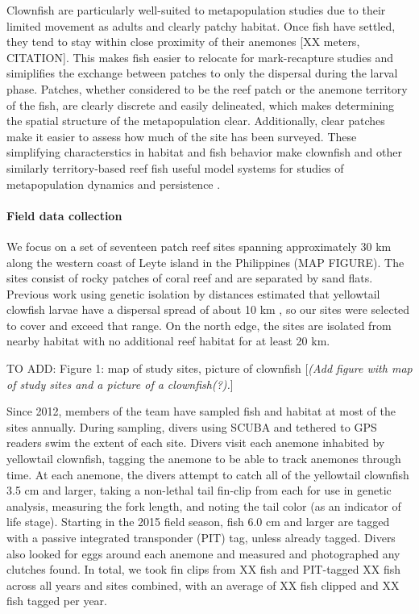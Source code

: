 \documentclass[12pt, oneside]{article}   	%
\begin{document}
Clownfish are particularly well-suited to metapopulation studies due to their limited movement as adults and clearly patchy habitat. Once fish have settled, they tend to stay within close proximity of their anemones [XX meters, CITATION]. This makes fish easier to relocate for mark-recapture studies and simiplifies the exchange between patches to only the dispersal during the larval phase. Patches, whether considered to be the reef patch or the anemone territory of the fish, are clearly discrete and easily delineated, which makes determining the spatial structure of the metapopulation clear. Additionally, clear patches make it easier to assess how much of the site has been surveyed. These simplifying characterstics in habitat and fish behavior make clownfish and other similarly territory-based reef fish useful model systems for studies of metapopulation dynamics and persistence \citep[e.g.][]{buston2013marine, salles_coral_2015, johnson2018integrating}.

\paragraph*{Field data collection}

We focus on a set of seventeen patch reef sites spanning approximately 30 km along the western coast of Leyte island in the Philippines (MAP FIGURE). The sites consist of rocky patches of coral reef and are separated by sand flats. Previous work using genetic isolation by distances estimated that yellowtail clowfish larvae have a dispersal spread of about 10 km \citep[range 4-27 km,][]{pinsky2010using}, so our sites were selected to cover and exceed that range. On the north edge, the sites are isolated from nearby habitat with no additional reef habitat for at least 20 km. %

TO ADD: Figure 1: map of study sites, picture of clownfish
[\textit{(Add figure with map of study sites and a picture of a clownfish(?).}]

Since 2012, members of the team have sampled fish and habitat at most of the sites annually. During sampling, divers using SCUBA and tethered to GPS readers swim the extent of each site. Divers visit each anemone inhabited by yellowtail clownfish, tagging the anemone to be able to track anemones through time. At each anemone, the divers attempt to catch all of the yellowtail clownfish 3.5 cm and larger, taking a non-lethal tail fin-clip from each for use in genetic analysis, measuring the fork length, and noting the tail color (as an indicator of life stage). Starting in the 2015 field season, fish 6.0 cm and larger are tagged with a passive integrated transponder (PIT) tag, unless already tagged. Divers also looked for eggs around each anemone and measured and photographed any clutches found. In total, we took fin clips from XX fish and PIT-tagged XX fish across all years and sites combined, with an average of XX fish clipped and XX fish tagged per year.
\end{document}
